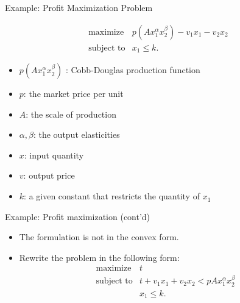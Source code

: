 \documentclass[10pt,ignorenonframetext,serif,onlymath]{beamer}
\providecommand{\tightlist}{%
  \setlength{\itemsep}{0pt}\setlength{\parskip}{0pt}}
\begin{document}
\begin{frame}{Example: Profit Maximization Problem}
\protect\hypertarget{example-profit-maximization-problem}{}

\[\begin{array}{ll}
   \text{maximize} & p(A x_1^\alpha x_2^\beta) - v_1 x_1 - v_2 x_2 \\
   \text{subject to}& x_1 \le k.
\end{array}\]

\begin{itemize}
\tightlist
\item
  \(p(A x_1^\alpha x_2^\beta)\) : Cobb-Douglas production function
\item
  \(p\): the market price per unit
\item
  \(A\): the scale of production
\item
  \(\alpha, \beta\): the output elasticities
\item
  \(x\): input quantity
\item
  \(v\): output price
\item
  \(k\): a given constant that restricts the quantity of \(x_1\)
\end{itemize}

\end{frame}

\begin{frame}{Example: Profit maximization (cont’d)}
\protect\hypertarget{example-profit-maximization-contd}{}

\begin{itemize}
\tightlist
\item
  The formulation is not in the convex form.
\item
  Rewrite the problem in the following form: \[\begin{array}{ll}
    \text{maximize} & t \\
    \text{subject to} & t  + v_1 x_1  + v_2 x_2 < p A x_1^{\alpha} x_2^{\beta}\\
                  & x_1 \le k.
    \end{array}\]
\end{itemize}

\end{frame}
\end{document}

